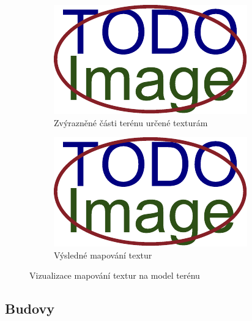 \begin{figure}[H]
	\centering
	\begin{subfigure}{0.49\textwidth}
		\includegraphics[width=\textwidth]{obrazky-figures/placeholder.pdf}
		\caption{Zvýrazněné části terénu určené texturám}
		\label{fig:textury:terén:místa}
	\end{subfigure}
	\hfill
	\begin{subfigure}{0.49\textwidth}
		\includegraphics[width=\textwidth]{obrazky-figures/placeholder.pdf}
		\caption{Výsledné mapování textur}
		\label{fig:textury:terén:výsledek}
	\end{subfigure}
	\caption{Vizualizace mapování textur na model terénu}
	\label{fig:textury:terén}
\end{figure}

\subsection{Budovy}\label{ch:impl:textury:budovy}


